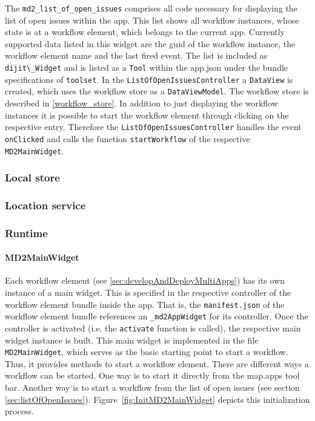 The \lstinline!md2_list_of_open_issues! comprises all code necessary for displaying the list of open issues within the app. This list shows all workflow instances, whose state is at a workflow element, which belongs to the current app. Currently supported data listed in this widget are the guid of the workflow instance, the workflow element name and the last fired event. 
The list is included as \lstinline!dijit\_Widget! and is listed as a \texttt{Tool} within the app.json under the bundle specifications of \lstinline!toolset!. In the \lstinline!ListOfOpenIssuesController! a \lstinline!DataView! is created, which uses the workflow store as a \lstinline!DataViewModel!. The workflow store is described in \cref{workflow_store}.
In addition to just displaying the workflow instances it is possible to start the workflow element through clicking on the respective entry. Therefore the \lstinline!ListOfOpenIssuesController! handles the event \lstinline!onClicked! and calls the function \lstinline!startWorkflow! of the respective \lstinline!MD2MainWidget!.

\subsubsection{Local store}

\subsubsection{Location service}

\subsubsection{Runtime}

\paragraph{MD2MainWidget}
Each workflow element (see \ref{sec:developAndDeployMultiApps}) has its own instance of a \MD main widget. This is specified in the respective controller of the workflow element bundle inside the app. That is, the \texttt{manifest.json} of the workflow element bundle references an \texttt{\_md2AppWidget} for its controller. Once the controller is activated (i.e. the \texttt{activate} function is called), the respective \MD main widget instance is built. This \MD main widget is implemented in the file \texttt{MD2MainWidget}, which serves as the basic starting point to start a workflow. Thus, it provides methods to start a workflow element. There are different ways a workflow can be started. One way is to start it directly from the map.apps tool bar. Another way is to start a workflow from the list of open issues (see section \ref{sec:listOfOpenIssues}). Figure~\ref{fig:InitMD2MainWidget} depicts this initialization process.

